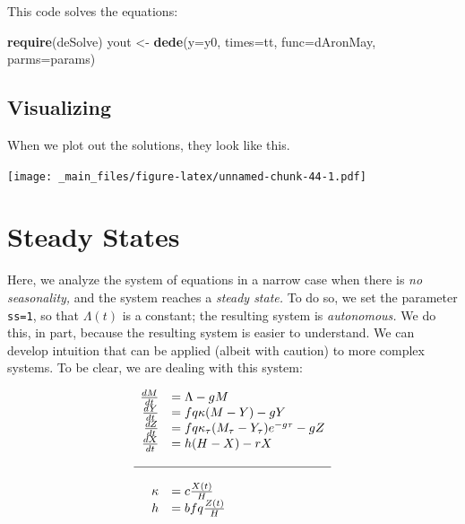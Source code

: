 \documentclass[
]{book}
\newenvironment{Shaded}{\begin{snugshade}}{\end{snugshade}}
\newcommand{\AttributeTok}[1]{\textcolor[rgb]{0.13,0.29,0.53}{#1}}
\newcommand{\FunctionTok}[1]{\textcolor[rgb]{0.13,0.29,0.53}{\textbf{#1}}}
\newcommand{\NormalTok}[1]{#1}
\newcommand{\OtherTok}[1]{\textcolor[rgb]{0.56,0.35,0.01}{#1}}
\begin{document}
This code solves the equations:

\begin{Shaded}
\begin{Highlighting}[]
\FunctionTok{require}\NormalTok{(deSolve)}
\NormalTok{yout }\OtherTok{\textless{}{-}} \FunctionTok{dede}\NormalTok{(}\AttributeTok{y=}\NormalTok{y0, }\AttributeTok{times=}\NormalTok{tt, }\AttributeTok{func=}\NormalTok{dAronMay, }\AttributeTok{parms=}\NormalTok{params) }
\end{Highlighting}
\end{Shaded}

\subsection{Visualizing}\label{visualizing}

When we plot out the solutions, they look like this.

\texttt{[image: \_main\_files/figure-latex/unnamed-chunk-44-1.pdf]}

\clearpage

\section{Steady States}\label{steady-states}

Here, we analyze the system of equations in a narrow case when there is \emph{no seasonality,} and the system reaches a \emph{steady state.} To do so, we set the parameter \texttt{ss=1}, so that \(\Lambda(t)\) is a constant; the resulting system is \emph{autonomous.} We do this, in part, because the resulting system is easier to understand. We can develop intuition that can be applied (albeit with caution) to more complex systems. To be clear, we are dealing with this system:

\begin{equation}
\begin{array}{rl}
\frac{dM}{dt} &= \Lambda - g M \\
\frac{dY}{dt} &= fq\kappa(M-Y) - g Y \\
\frac{dZ}{dt} &= fq\kappa_\tau(M_\tau-Y_\tau)e^{-g\tau} - g Z \\
\frac{dX}{dt} &= h (H-X) - rX  \\ \\ \hline \\ 
\kappa &= c \frac{X(t)}{H} \\
h &= b fq \frac{Z(t)}{H} \\
\end{array}
\end{equation}
\end{document}
